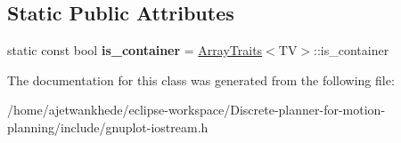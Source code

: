\subsection*{Static Public Attributes}
\begin{DoxyCompactItemize}
\item 
\mbox{\label{classgnuplotio_1_1IteratorRange_a3f79d84bdf18761b6e49ae54d050f8ff}} 
static const bool {\bfseries is\+\_\+container} = \mbox{\hyperlink{classgnuplotio_1_1ArrayTraits}{Array\+Traits}}$<$TV$>$\+::is\+\_\+container
\end{DoxyCompactItemize}


The documentation for this class was generated from the following file\+:\begin{DoxyCompactItemize}
\item 
/home/ajetwankhede/eclipse-\/workspace/\+Discrete-\/planner-\/for-\/motion-\/planning/include/gnuplot-\/iostream.\+h\end{DoxyCompactItemize}
